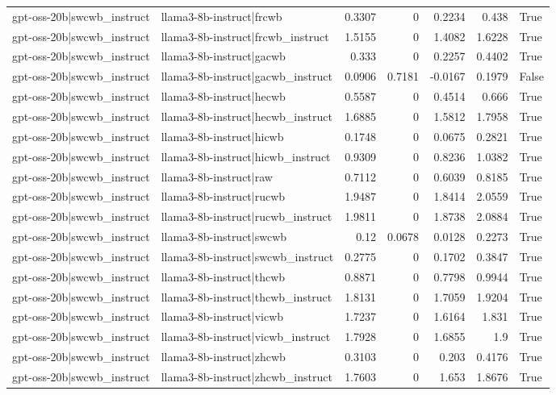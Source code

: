 \begin{table}
\begin{tabular}{l l r r r r l}
gpt-oss-20b|swcwb_instruct & llama3-8b-instruct|frcwb & 0.3307 & 0 & 0.2234 & 0.438 & True \\
gpt-oss-20b|swcwb_instruct & llama3-8b-instruct|frcwb_instruct & 1.5155 & 0 & 1.4082 & 1.6228 & True \\
gpt-oss-20b|swcwb_instruct & llama3-8b-instruct|gacwb & 0.333 & 0 & 0.2257 & 0.4402 & True \\
gpt-oss-20b|swcwb_instruct & llama3-8b-instruct|gacwb_instruct & 0.0906 & 0.7181 & -0.0167 & 0.1979 & False \\
gpt-oss-20b|swcwb_instruct & llama3-8b-instruct|hecwb & 0.5587 & 0 & 0.4514 & 0.666 & True \\
gpt-oss-20b|swcwb_instruct & llama3-8b-instruct|hecwb_instruct & 1.6885 & 0 & 1.5812 & 1.7958 & True \\
gpt-oss-20b|swcwb_instruct & llama3-8b-instruct|hicwb & 0.1748 & 0 & 0.0675 & 0.2821 & True \\
gpt-oss-20b|swcwb_instruct & llama3-8b-instruct|hicwb_instruct & 0.9309 & 0 & 0.8236 & 1.0382 & True \\
gpt-oss-20b|swcwb_instruct & llama3-8b-instruct|raw & 0.7112 & 0 & 0.6039 & 0.8185 & True \\
gpt-oss-20b|swcwb_instruct & llama3-8b-instruct|rucwb & 1.9487 & 0 & 1.8414 & 2.0559 & True \\
gpt-oss-20b|swcwb_instruct & llama3-8b-instruct|rucwb_instruct & 1.9811 & 0 & 1.8738 & 2.0884 & True \\
gpt-oss-20b|swcwb_instruct & llama3-8b-instruct|swcwb & 0.12 & 0.0678 & 0.0128 & 0.2273 & True \\
gpt-oss-20b|swcwb_instruct & llama3-8b-instruct|swcwb_instruct & 0.2775 & 0 & 0.1702 & 0.3847 & True \\
gpt-oss-20b|swcwb_instruct & llama3-8b-instruct|thcwb & 0.8871 & 0 & 0.7798 & 0.9944 & True \\
gpt-oss-20b|swcwb_instruct & llama3-8b-instruct|thcwb_instruct & 1.8131 & 0 & 1.7059 & 1.9204 & True \\
gpt-oss-20b|swcwb_instruct & llama3-8b-instruct|vicwb & 1.7237 & 0 & 1.6164 & 1.831 & True \\
gpt-oss-20b|swcwb_instruct & llama3-8b-instruct|vicwb_instruct & 1.7928 & 0 & 1.6855 & 1.9 & True \\
gpt-oss-20b|swcwb_instruct & llama3-8b-instruct|zhcwb & 0.3103 & 0 & 0.203 & 0.4176 & True \\
gpt-oss-20b|swcwb_instruct & llama3-8b-instruct|zhcwb_instruct & 1.7603 & 0 & 1.653 & 1.8676 & True \\

\end{tabular}
\end{table}
